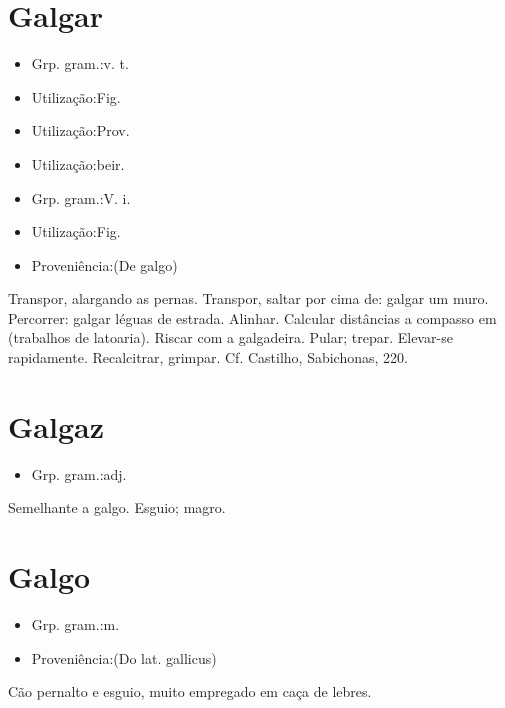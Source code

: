 \section{Galgar}
\begin{itemize}
\item {Grp. gram.:v. t.}
\end{itemize}
\begin{itemize}
\item {Utilização:Fig.}
\end{itemize}
\begin{itemize}
\item {Utilização:Prov.}
\end{itemize}
\begin{itemize}
\item {Utilização:beir.}
\end{itemize}
\begin{itemize}
\item {Grp. gram.:V. i.}
\end{itemize}
\begin{itemize}
\item {Utilização:Fig.}
\end{itemize}
\begin{itemize}
\item {Proveniência:(De \textunderscore galgo\textunderscore )}
\end{itemize}
Transpor, alargando as pernas.
Transpor, saltar por cima de: \textunderscore galgar um muro\textunderscore .
Percorrer: \textunderscore galgar léguas de estrada\textunderscore .
Alinhar.
Calcular distâncias a compasso em (trabalhos de latoaria).
Riscar com a galgadeira.
Pular; trepar.
Elevar-se rapidamente.
Recalcitrar, grimpar. Cf. Castilho, \textunderscore Sabichonas\textunderscore , 220.
\section{Galgaz}
\begin{itemize}
\item {Grp. gram.:adj.}
\end{itemize}
Semelhante a galgo.
Esguio; magro.
\section{Galgo}
\begin{itemize}
\item {Grp. gram.:m.}
\end{itemize}
\begin{itemize}
\item {Proveniência:(Do lat. \textunderscore gallicus\textunderscore )}
\end{itemize}
Cão pernalto e esguio, muito empregado em caça de lebres.

